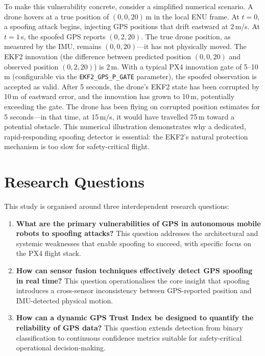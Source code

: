 To make this vulnerability concrete, consider a simplified numerical scenario. A drone hovers at a true position of $(0, 0, 20)$\,m in the local ENU frame. At $t = 0$, a spoofing attack begins, injecting GPS positions that drift eastward at 2\,m/s. At $t = 1$\,s, the spoofed GPS reports $(0, 2, 20)$. The true drone position, as measured by the IMU, remains $(0, 0, 20)$---it has not physically moved. The EKF2 innovation (the difference between predicted position $(0, 0, 20)$ and observed position $(0, 2, 20)$) is 2\,m. With a typical PX4 innovation gate of 5--10\,m (configurable via the \texttt{EKF2\_GPS\_P\_GATE} parameter), the spoofed observation is accepted as valid. After 5 seconds, the drone's EKF2 state has been corrupted by 10\,m of eastward error, and the innovation has grown to 10\,m, potentially exceeding the gate. The drone has been flying on corrupted position estimates for 5 seconds---in that time, at 15\,m/s, it would have travelled 75\,m toward a potential obstacle. This numerical illustration demonstrates why a dedicated, rapid-responding spoofing detector is essential: the EKF2's natural protection mechanism is too slow for safety-critical flight.

\section{Research Questions}

This study is organised around three interdependent research questions:

\begin{enumerate}[label=\textbf{RQ\arabic*:},leftmargin=3em]
    \item \textbf{What are the primary vulnerabilities of GPS in autonomous mobile robots to spoofing attacks?} This question addresses the architectural and systemic weaknesses that enable spoofing to succeed, with specific focus on the PX4 flight stack.
    \item \textbf{How can sensor fusion techniques effectively detect GPS spoofing in real time?} This question operationalises the core insight that spoofing introduces a cross-sensor inconsistency between GPS-reported position and IMU-detected physical motion.
    \item \textbf{How can a dynamic GPS Trust Index be designed to quantify the reliability of GPS data?} This question extends detection from binary classification to continuous confidence metrics suitable for safety-critical operational decision-making.
\end{enumerate}

